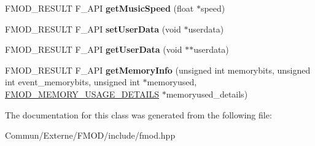 \begin{DoxyCompactItemize}
\item 
F\+M\+O\+D\+\_\+\+R\+E\+S\+U\+LT F\+\_\+\+A\+PI {\bfseries get\+Music\+Speed} (float $\ast$speed)\hypertarget{class_f_m_o_d_1_1_sound_a22e4865bfd9f4bf40633671439dade82}{}\label{class_f_m_o_d_1_1_sound_a22e4865bfd9f4bf40633671439dade82}

\item 
F\+M\+O\+D\+\_\+\+R\+E\+S\+U\+LT F\+\_\+\+A\+PI {\bfseries set\+User\+Data} (void $\ast$userdata)\hypertarget{class_f_m_o_d_1_1_sound_ac921f8c260ef5b396a837016d5882713}{}\label{class_f_m_o_d_1_1_sound_ac921f8c260ef5b396a837016d5882713}

\item 
F\+M\+O\+D\+\_\+\+R\+E\+S\+U\+LT F\+\_\+\+A\+PI {\bfseries get\+User\+Data} (void $\ast$$\ast$userdata)\hypertarget{class_f_m_o_d_1_1_sound_a829f8e68b254764374c38e6e23f7f8df}{}\label{class_f_m_o_d_1_1_sound_a829f8e68b254764374c38e6e23f7f8df}

\item 
F\+M\+O\+D\+\_\+\+R\+E\+S\+U\+LT F\+\_\+\+A\+PI {\bfseries get\+Memory\+Info} (unsigned int memorybits, unsigned int event\+\_\+memorybits, unsigned int $\ast$memoryused, \hyperlink{struct_f_m_o_d___m_e_m_o_r_y___u_s_a_g_e___d_e_t_a_i_l_s}{F\+M\+O\+D\+\_\+\+M\+E\+M\+O\+R\+Y\+\_\+\+U\+S\+A\+G\+E\+\_\+\+D\+E\+T\+A\+I\+LS} $\ast$memoryused\+\_\+details)\hypertarget{class_f_m_o_d_1_1_sound_abf8d14ac330b572417f9f949456848d5}{}\label{class_f_m_o_d_1_1_sound_abf8d14ac330b572417f9f949456848d5}

\end{DoxyCompactItemize}


The documentation for this class was generated from the following file\+:\begin{DoxyCompactItemize}
\item 
Commun/\+Externe/\+F\+M\+O\+D/include/fmod.\+hpp\end{DoxyCompactItemize}
